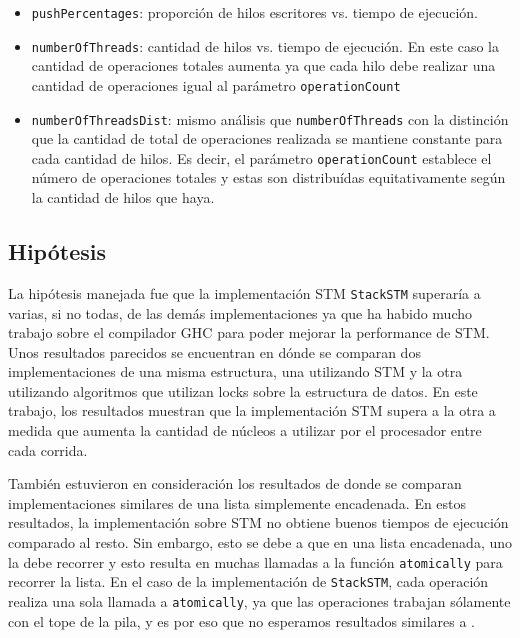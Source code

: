 \begin{itemize}
    \item \texttt{pushPercentages}: proporción de hilos escritores vs. tiempo de ejecución.
    \item \texttt{numberOfThreads}: cantidad de hilos vs. tiempo de ejecución. En este caso la cantidad de operaciones totales aumenta ya que cada hilo debe realizar una cantidad de operaciones igual al parámetro \texttt{operationCount}
    \item \texttt{numberOfThreadsDist}: mismo análisis que \texttt{numberOfThreads} con la distinción que la cantidad de total de operaciones realizada se mantiene constante para cada cantidad de hilos. Es decir, el parámetro \texttt{operationCount} establece el número de operaciones totales y estas son distribuídas equitativamente según la cantidad de hilos que haya.
\end{itemize}

\subsection{Hipótesis}\label{subsec:hypothesis}
La hipótesis manejada fue que la implementación STM \texttt{StackSTM} superaría a varias, si no todas, de las demás implementaciones ya que ha habido mucho trabajo sobre el compilador GHC para poder mejorar la performance de STM.
Unos resultados parecidos se encuentran en \cite{abq} dónde se comparan dos implementaciones de una misma estructura, una utilizando STM y la otra utilizando algoritmos que utilizan locks sobre la estructura de datos.
En este trabajo, los resultados muestran que la implementación STM supera a la otra a medida que aumenta la cantidad de núcleos a utilizar por el procesador entre cada corrida.

También estuvieron en consideración los resultados de \cite{linked-list} donde se comparan implementaciones similares de una lista simplemente encadenada.
En estos resultados, la implementación sobre STM no obtiene buenos tiempos de ejecución comparado al resto.
Sin embargo, esto se debe a que en una lista encadenada, uno la debe recorrer y esto resulta en muchas llamadas a la función \texttt{atomically} para recorrer la lista.
En el caso de la implementación de \texttt{StackSTM}, cada operación realiza una sola llamada a \texttt{atomically}, ya que las operaciones trabajan sólamente con el tope de la pila, y es por eso que no esperamos resultados similares a \cite{linked-list}.

